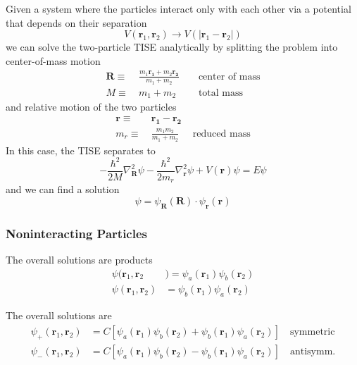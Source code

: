 Given a system where the particles interact only with each other via a potential that depends on their separation
\begin{equation*}
    V(\mathbf{r}_1,\mathbf{r}_2)\to V(|\mathbf{r}_1-\mathbf{r}_2|)
\end{equation*}
we can solve the two-particle TISE analytically by splitting the problem into center-of-mass motion
\begin{align*}
    \mathbf{R}\equiv\  & \frac{m_1\mathbf{r_1}+m_2\mathbf{r_2}}{m_1+m_2} &  & \text{ center of mass} \\
    M\equiv\           & m_1 + m_2                                       &  & \text{ total mass}
\end{align*}
and relative motion of the two particles
\begin{align*}
    \mathbf{r}\equiv\  & \mathbf{r_1}-\mathbf{r_2} &                      \\
    m_r\equiv\         & \frac{m_1 m_2}{m_1+m_2}   & \text{ reduced mass}
\end{align*}
In this case, the TISE separates to
\begin{equation*}
    -\frac{\hbar^{2}}{2M}\nabla_{\mathbf{R}}^{2}\psi-\frac{\hbar^{2}}{2m_r}\nabla_{\mathbf{r}}^{2}\psi+V(\mathbf{r})\psi=E\psi
\end{equation*}
and we can find a solution
\begin{equation*}
    \psi = \psi_\mathbf{R}(\mathbf{R})\cdot\psi_\mathbf{r}(\mathbf{r})
\end{equation*}

\subsubsection{Noninteracting Particles}
\newpar{}

The overall solutions are products
\begin{align*}
    \psi(\mathbf{r}_{1},\mathbf{r}_{2}  & )=\psi_{a}(\mathbf{r}_{1})\psi_{b}(\mathbf{r}_{2}) \\
    \psi(\mathbf{r}_{1},\mathbf{r}_{2}) & =\psi_{b}(\mathbf{r}_{1})\psi_{a}(\mathbf{r}_{2})
\end{align*}

\newpar{}

The overall solutions are
\begin{align*}
    \psi_{+}(\mathbf{r}_{1},\mathbf{r}_{2}) & =C\left[\psi_{a}(\mathbf{r}_{1})\psi_{b}(\mathbf{r}_{2})+\psi_{b}(\mathbf{r}_{1})\psi_{a}(\mathbf{r}_{2})\right]\quad \mathrm{symmetric} \\
    \psi_{-}(\mathbf{r}_{1},\mathbf{r}_{2}) & =C\left[\psi_{a}(\mathbf{r}_{1})\psi_{b}(\mathbf{r}_{2})-\psi_{b}(\mathbf{r}_{1})\psi_{a}(\mathbf{r}_{2})\right]\quad \mathrm{antisymm.}
\end{align*}

